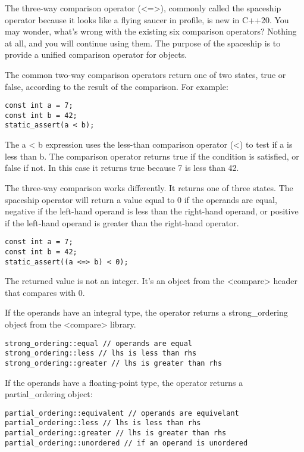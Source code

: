 
The three-way comparison operator (<=>), commonly called the spaceship operator because it looks like a flying saucer in profile, is new in C++20. You may wonder, what's wrong with the existing six comparison operators? Nothing at all, and you will continue using them. The purpose of the spaceship is to provide a unified comparison operator for objects.

The common two-way comparison operators return one of two states, true or false, according to the result of the comparison. For example:

\begin{lstlisting}[style=styleCXX]
const int a = 7;
const int b = 42;
static_assert(a < b);
\end{lstlisting}

The a < b expression uses the less-than comparison operator (<) to test if a is less than b. The comparison operator returns true if the condition is satisfied, or false if not. In this case it returns true because 7 is less than 42.

The three-way comparison works differently. It returns one of three states. The spaceship operator will return a value equal to 0 if the operands are equal, negative if the left-hand operand is less than the right-hand operand, or positive if the left-hand operand is greater than the right-hand operator.

\begin{lstlisting}[style=styleCXX]
const int a = 7;
const int b = 42;
static_assert((a <=> b) < 0);
\end{lstlisting}

The returned value is not an integer. It's an object from the <compare> header that compares with 0.

If the operands have an integral type, the operator returns a strong\_ordering object from the <compare> library.

\begin{lstlisting}[style=styleCXX]
strong_ordering::equal // operands are equal
strong_ordering::less // lhs is less than rhs
strong_ordering::greater // lhs is greater than rhs
\end{lstlisting}

If the operands have a floating-point type, the operator returns a partial\_ordering object:

\begin{lstlisting}[style=styleCXX]
partial_ordering::equivalent // operands are equivelant
partial_ordering::less // lhs is less than rhs
partial_ordering::greater // lhs is greater than rhs
partial_ordering::unordered // if an operand is unordered
\end{lstlisting}

